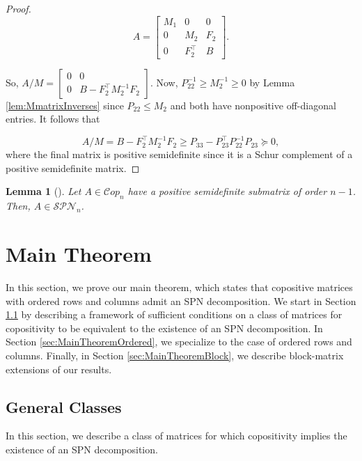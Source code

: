 \documentclass{amsart}
\newcommand{\Cop}{\mathcal{C}op}
\newcommand{\SPN}{\mathcal{SPN}}
\newtheorem{lemma}[theorem]{Lemma}
\theoremstyle{definition}
\begin{document}
\begin{proof}
\[A = \begin{bmatrix} M_1 & 0 & 0\\ 0 & M_2 & F_2\\ 0 & F_2^\top & B\end{bmatrix}.\]

So, $\displaystyle{A/M = \begin{bmatrix}0 & 0\\ 0 & B - F_2^\top M_2^{-1} F_2\end{bmatrix}}$. Now, $P_{22}^{-1} \geq M_2^{-1} \geq 0$ by Lemma \ref{lem:MmatrixInverses} since $P_{22} \leq M_2$ and both have nonpositive off-diagonal entries. It follows that

\[A/M = B - F_2^\top M_2^{-1}F_2 \geq P_{33} - P_{23}^\top P_{22}^{-1}P_{23} \succeq 0,\]
%
where the final matrix is positive semidefinite since it is a Schur complement of a positive semidefinite matrix. 
\end{proof}

\begin{lemma}[{\cite[Lemma 3.1]{shaked-monderer_spn_2016}}]\label{lem:COP=SPNwith_PSD_submatrix}
Let $A\in \Cop_n$ have a positive semidefinite submatrix of order $n-1$. Then, $A\in \SPN_n$.
\end{lemma}


\section{Main Theorem}\label{sec:MainTheorem}

In this section, we prove our main theorem, which states that copositive matrices with ordered rows and columns admit an SPN decomposition. We start in Section \ref{sec:MainTheoremGeneral} by describing a framework of sufficient conditions on a class of matrices for copositivity to be equivalent to the existence of an SPN decomposition. In Section \ref{sec:MainTheoremOrdered}, we specialize to the case of ordered rows and columns. Finally, in Section \ref{sec:MainTheoremBlock}, we describe block-matrix extensions of our results. 

\subsection{General Classes}\label{sec:MainTheoremGeneral}
In this section, we describe a class of matrices for which copositivity implies the existence of an SPN decomposition. 
\end{document}
